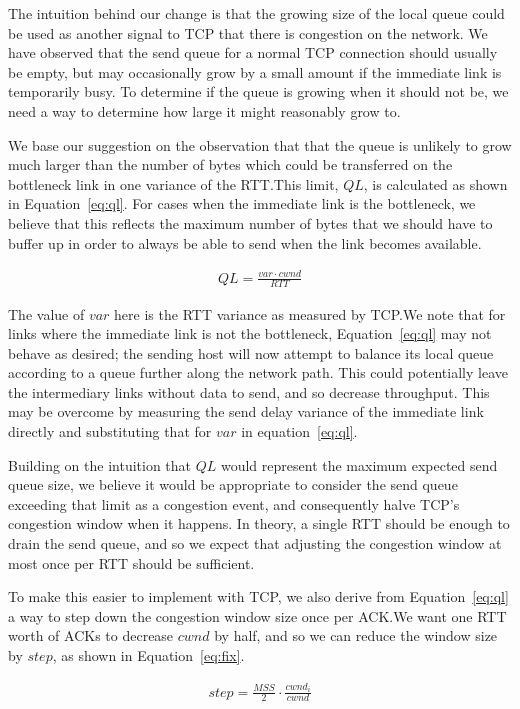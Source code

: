 The intuition behind our change is that the growing size of the local queue
could be used as another signal to TCP that there is congestion on the network.
We have observed that the send queue for a
normal TCP connection should usually be empty, but may occasionally grow by
a small amount if the immediate link is temporarily busy. To determine if the queue is
growing when it should not be, we need a way to determine how large it might
reasonably grow to.

We base our suggestion on the observation that that the queue is unlikely to
grow much larger than the number of bytes which could be transferred on the
bottleneck link in one variance of the RTT.\@ This limit, $QL$, is calculated
as shown in Equation~\ref{eq:ql}. For cases when the immediate link
is the bottleneck, we believe that this reflects the maximum number of bytes that
we should have to buffer up in order to always be able to send when the link becomes available. 

\begin{align}
  QL = \frac{var \cdot cwnd}{RTT}\label{eq:ql}
\end{align}

The value of $var$ here is the RTT
variance as measured by TCP.\@ We note that for links where the immediate link is not
the bottleneck,
Equation~\ref{eq:ql} may not behave as desired; the sending host will now
attempt to balance its local queue according to a queue further along the
network path. This could potentially leave the intermediary links without data
to send, and so decrease throughput. This may be overcome by measuring the
send delay variance
of the immediate link directly and substituting that for $var$ in
equation~\ref{eq:ql}.

Building on the intuition that $QL$ would represent the maximum expected send
queue size, we believe it would be appropriate to consider the send queue
exceeding that limit as a congestion event, and consequently halve TCP's congestion
window when it happens. In
theory, a single RTT should be enough to drain the send queue, and so we expect
that adjusting the congestion window at most once per RTT should be sufficient.

To make this easier to implement with TCP, we also derive from Equation~\ref{eq:ql}
a way to step down the congestion window size once per ACK.\@ We want one RTT
worth of ACKs to decrease $cwnd$ by half, and so we can reduce the window size
by $step$, as shown in Equation~\ref{eq:fix}.

\begin{align}
  step = \frac{MSS}{2} \cdot \frac{cwnd_i}{cwnd}\label{eq:fix}
\end{align}

